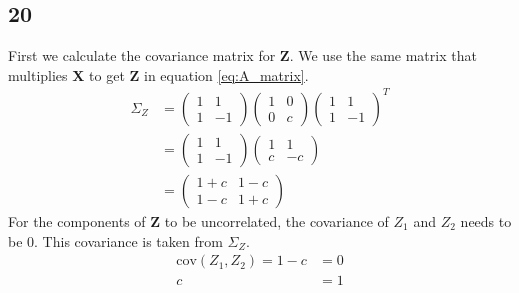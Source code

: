 \documentclass[a4paper,12px]{article}
\begin{document}
\subsection{20}
First we calculate the covariance matrix for \textbf{Z}. We use the same matrix
 that multiplies \textbf{X} to get \textbf{Z} in equation \ref{eq:A_matrix}.
\begin{equation}
    \begin{aligned}
    \Sigma_Z&=\left(\begin{matrix}1&1\\1&-1\end{matrix}\right)
    \left(\begin{matrix}1&0\\0&c\end{matrix}\right)
    \left(\begin{matrix}1&1\\1&-1\end{matrix}\right)^T\\
    &=\left(\begin{matrix}1&1\\1&-1\end{matrix}\right)
    \left(\begin{matrix}1&1\\c&-c\end{matrix}\right)\\
    &=\left(\begin{matrix}1+c&1-c\\1-c&1+c\end{matrix}\right)
    \end{aligned}
\end{equation}
For the components of \textbf{Z} to be uncorrelated, the covariance of $Z_1$
 and $Z_2$ needs to be 0. This covariance is taken from $\Sigma_Z$.
\begin{equation}
    \begin{aligned}
    \text{cov}(Z_1, Z_2)=1-c&=0\\
    c&=1
    \end{aligned}
\end{equation}
\end{document}
